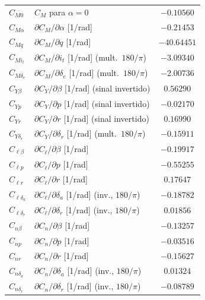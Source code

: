 \begin{tabular}{llc}
$C_{M0}$ & $C_M$ para $\alpha=0$ & $-0.10560$ \\
$C_{M\alpha}$ & $\partial C_M/\partial\alpha$ [1/rad] & $-0.21453$ \\
$C_{Mq}$ & $\partial C_M/\partial q$ [1/rad] & $-40.64451$ \\
$C_{Mi_t}$ & $\partial C_M/\partial i_t$ [1/rad] (mult.\ $180/\pi$) & $-3.09340$ \\
$C_{M\delta_e}$ & $\partial C_M/\partial\delta_e$ [1/rad] (mult.\ $180/\pi$) & $-2.00736$ \\
$C_{Y\beta}$ & $\partial C_Y/\partial\beta$ [1/rad] (sinal invertido) & $0.56290$ \\
$C_{Yp}$ & $\partial C_Y/\partial p$ [1/rad] (sinal invertido) & $-0.02170$ \\
$C_{Yr}$ & $\partial C_Y/\partial r$ [1/rad] (sinal invertido) & $0.16990$ \\
$C_{Y\delta_r}$ & $\partial C_Y/\partial\delta_r$ [1/rad] (mult.\ $180/\pi$) & $-0.15911$ \\
$C_{\ell\beta}$ & $\partial C_\ell/\partial\beta$ [1/rad] & $-0.19917$ \\
$C_{\ell p}$ & $\partial C_\ell/\partial p$ [1/rad] & $-0.55255$ \\
$C_{\ell r}$ & $\partial C_\ell/\partial r$ [1/rad] & $0.17647$ \\
$C_{\ell\delta_a}$ & $\partial C_\ell/\partial\delta_a$ [1/rad] (inv., $180/\pi$) & $-0.18782$ \\
$C_{\ell\delta_r}$ & $\partial C_\ell/\partial\delta_r$ [1/rad] (inv., $180/\pi$) & $0.01856$ \\
$C_{n\beta}$ & $\partial C_n/\partial\beta$ [1/rad] & $-0.13257$ \\
$C_{np}$ & $\partial C_n/\partial p$ [1/rad] & $-0.03516$ \\
$C_{nr}$ & $\partial C_n/\partial r$ [1/rad] & $-0.15627$ \\
$C_{n\delta_a}$ & $\partial C_n/\partial\delta_a$ [1/rad] (inv., $180/\pi$) & $0.01324$ \\
$C_{n\delta_r}$ & $\partial C_n/\partial\delta_r$ [1/rad] (inv., $180/\pi$) & $-0.08789$ \\
\bottomrule
\end{tabular}
